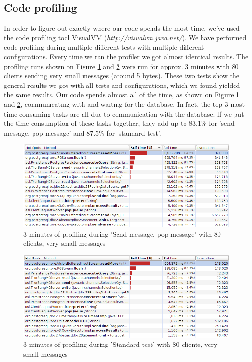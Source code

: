 \documentclass{article}
\begin{document}
        \subsection{Code profiling}
            In order to figure out exactly where our code spends the most time, we've used the code profiling tool VisualVM (\textit{http://visualvm.java.net/}). We have performed code profiling during multiple different tests with multiple different configurations. Every time we ran the profiler we got almost identical results. The profiling runs shown on Figure \ref{fig:code_profiling_send_pop_same_client} and \ref{fig:code_profiling_standard_test} were run for approx. 3 minutes with 80 clients sending very small messages (around 5 bytes). These two tests show the general results we got with all tests and configurations, which we found yielded the same results.  Our code spends almost all of the time, as shown on Figure \ref{fig:code_profiling_send_pop_same_client} and \ref{fig:code_profiling_standard_test}, communicating with and waiting for the database. In fact, the top 3 most time consuming tasks are all due to communication with the database. If we put the time consumption of these tasks together, they add up to 83.1\% for 'send message, pop message' and 87.5\% for 'standard test'.
            \begin{figure}[H]
                \hspace{-1.5cm}
                \includegraphics[scale=0.50]{code_profiling_send_pop_same_client}
                \caption{3 minutes of profiling during 'Send message, pop message' with 80 clients, very small messages}
                \label{fig:code_profiling_send_pop_same_client}
            \end{figure}
            \begin{figure}[H]
                \hspace{-1.5cm}
                \includegraphics[scale=0.50]{code_profiling_standard_test}
                \caption{3 minutes of profiling during 'Standard test' with 80 clients, very small messages}
                \label{fig:code_profiling_standard_test}
            \end{figure}
\end{document}
